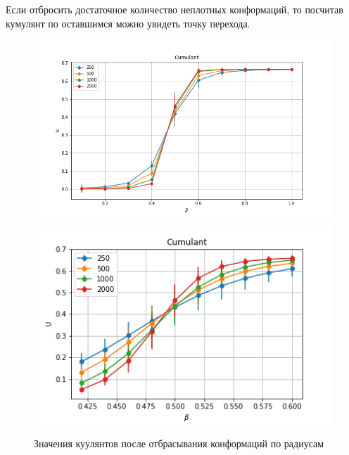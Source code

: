 Если отбросить достаточное количество неплотных конформаций, то посчитав кумулянт по оставшимся можно увидеть точку перехода.

\begin{figure}[h]
	\centering
	\includegraphics[width=1\textwidth]{../images/Cumulant_big.png} 
	\includegraphics[width=1\textwidth]{../images/Cumulant_beta0.4_0.6.png} 
	\caption{Значения куулянтов после отбрасывания конформаций по радиусам}
\end{figure}
